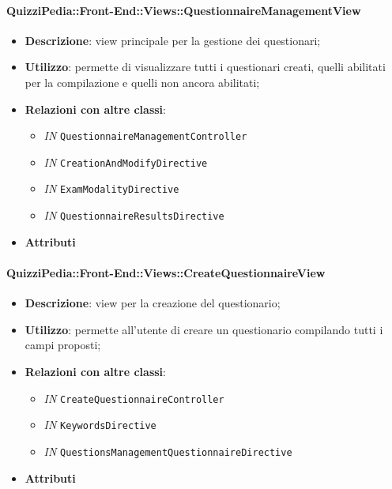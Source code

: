 \paragraph{QuizziPedia::Front-End::Views::QuestionnaireManagementView}
\begin{itemize}
	\item \textbf{Descrizione}: view principale per la gestione dei questionari;
	\item \textbf{Utilizzo}: permette di visualizzare tutti i questionari creati, quelli abilitati per la compilazione e quelli non ancora abilitati;
	\item \textbf{Relazioni con altre classi}:
	\begin{itemize}
		\item \textit{IN} \texttt{QuestionnaireManagementController} \\
		\item \textit{IN} \texttt{CreationAndModifyDirective} \\
		\item \textit{IN} \texttt{ExamModalityDirective} \\
		\item \textit{IN} \texttt{QuestionnaireResultsDirective} \\
	\end{itemize}
	\item \textbf{Attributi}
\end{itemize}

\paragraph{QuizziPedia::Front-End::Views::CreateQuestionnaireView}
\begin{itemize}
	\item \textbf{Descrizione}: view per la creazione del questionario;
	\item \textbf{Utilizzo}: permette all'utente di creare un questionario compilando tutti i campi proposti;
	\item \textbf{Relazioni con altre classi}:
	\begin{itemize}
		\item \textit{IN} \texttt{CreateQuestionnaireController} \\
		\item \textit{IN} \texttt{KeywordsDirective} \\
		\item \textit{IN} \texttt{QuestionsManagementQuestionnaireDirective} \\ 
	\end{itemize}
	\item \textbf{Attributi}
\end{itemize}

